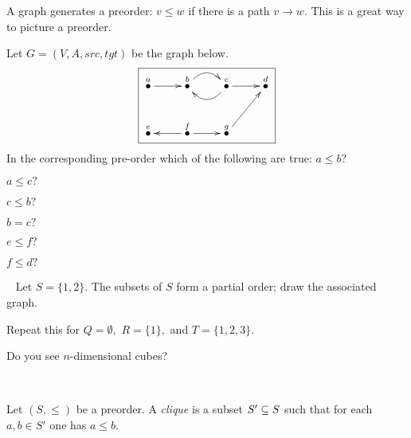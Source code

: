 \documentclass[CT4S-EN-RU]{subfiles}
\begin{document}
\begin{remarkRUS}\label{rem:preorder to graph}
\end{remarkRUS}

\begin{sloganENG}
A graph generates a preorder: $v\leq w$ if there is a path $v\to w.$ This is a great way to picture a preorder. 
\end{sloganENG}

\begin{sloganRUS}
\end{sloganRUS}

\begin{exerciseENG}
Let $G=(V,A,src,tgt)$ be the graph below. 
$$\fbox{\xymatrix{
\LMO{a}\ar[r]&\LMO{b}\ar@/^1pc/[r]&\LMO{c}\ar@/^1pc/[l]\ar[r]&\LMO{d}\\
\LMO{e}&\LMO{f}\ar[l]\ar[r]&\LMO{g}\ar[ur]}}
$$
In the corresponding pre-order which of the following are true: 
\sexc $a\leq b?$
\item $a\leq c?$
\item $c\leq b?$
\item $b=c?$
\item $e\leq f?$
\item $f\leq d?$
\endsexc
\end{exerciseENG}

\begin{exerciseRUS}
\end{exerciseRUS}

\begin{exerciseENG}\label{exc:power poset}~
\sexc Let $S=\{1,2\}.$ The subsets of $S$ form a partial order; draw the associated graph. 
\item Repeat this for $Q=\emptyset,$ $R=\{1\},$ and $T=\{1,2,3\}.$ 
\item Do you see $n$-dimensional cubes?
\endsexc
\end{exerciseENG}

\begin{exerciseRUS}\label{exc:power poset}~
\end{exerciseRUS}

\begin{definitionENG}\label{def:clique}
Let $(S,\leq)$ be a preorder. A {\em clique} is a subset $S'\ss S$ such that for each $a,b\in S'$ one has $a\leq b.$
\end{definitionENG}

\begin{definitionRUS}\label{def:clique}
\end{definitionRUS}
\end{document}
